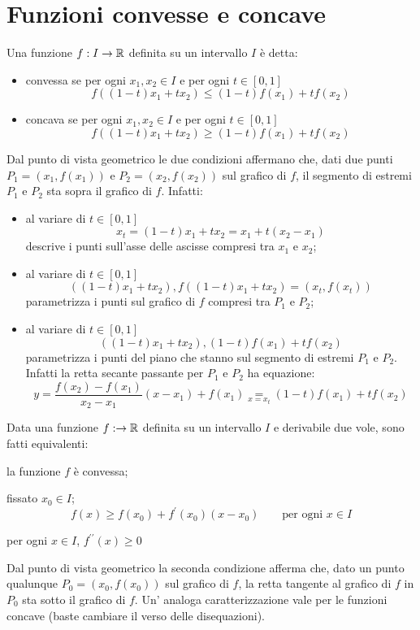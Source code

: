 \section{Funzioni convesse e concave}
Una funzione $f:I\rightarrow\mathbb{R}$ definita su un intervallo $I$ è detta:
\begin{itemize}
\item convessa se per ogni $x_1,x_2\in I$ e per ogni $t\in[0,1]$
\[f( (1-t)x_1+tx_2)\leq(1-t)f(x_1)+tf(x_2)\]
\item concava se per ogni $x_1,x_2\in I$ e per ogni $t\in[0,1]$
\[f( (1-t)x_1+tx_2)\geq(1-t)f(x_1)+tf(x_2)\]
\end{itemize}
Dal punto di vista geometrico le due condizioni affermano che, dati due punti $P_1=(x_1,f(x_1))$ e $P_2=(x_2,f(x_2))$ sul grafico di $f$, il segmento di estremi $P_1$ e $P_2$ sta sopra il grafico di $f$. Infatti:
\begin{itemize}
\item al variare di $t\in[0,1]$
\[x_t=(1-t)x_1+tx_2=x_1+t(x_2-x_1)\]
descrive i punti sull'asse delle ascisse compresi tra $x_1$ e $x_2$;
\item al variare di $t\in[0,1]$
\[((1-t)x_1+tx_2),f((1-t)x_1+tx_2)=(x_t,f(x_t))\]
parametrizza i punti sul grafico di $f$ compresi tra $P_1$ e $P_2$;
\item al variare di $t\in[0,1]$
\[((1-t)x_1+tx_2),(1-t)f(x_1)+tf(x_2)\]
parametrizza i punti del piano che stanno sul segmento di estremi $P_1$ e $P_2$.
Infatti la retta secante passante per $P_1$ e $P_2$ ha equazione:
\[y=\frac{f(x_2)-f(x_1)}{x_2-x_1}(x-x_1)+f(x_1) \underset{x=x_t}{=}(1-t)f(x_1)+tf(x_2)\]
\end{itemize}

\begin{teo}
Data una funzione $f:\rightarrow\mathbb{R}$ definita su un intervallo $I$ e derivabile due vole, sono fatti equivalenti:
\begin{aenumerate}
\item la funzione $f$ è convessa;
\item fissato $x_0 \in I$;
\[f(x)\geq f(x_0)+f^\prime(x_0)(x-x_0) \qquad \text{per ogni }x\in I\]
\item per ogni $x\in I$, $f^{\prime\prime}(x)\geq 0$
\end{aenumerate}
Dal punto di vista geometrico la seconda condizione afferma che, dato un punto qualunque $P_0=(x_0,f(x_0))$ sul grafico di $f$, la retta tangente al grafico di $f$ in $P_0$ sta sotto il grafico di $f$. Un' analoga caratterizzazione vale per le funzioni concave (baste cambiare il verso delle disequazioni).
\end{teo}


